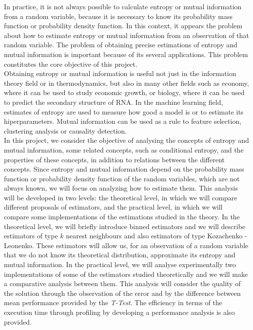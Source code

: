 In practice, it is not always possible to calculate entropy or mutual information from a random variable, because it is necessary to know its probability mass function or probability density function. In this context, it appears the problem about how to estimate entropy or mutual information from an observation of that random variable. The problem of obtaining precise estimations of entropy and mutual information is important because of its several applications. This problem constitutes the core objective of this project.\\

Obtaining entropy or mutual information is useful not just in the information theory field or in thermodynamics, but also in many other fields such as economy, where it can be used to study economic growth, or biology, where it can be used to predict the secondary structure of RNA. In the machine learning field, estimates of entropy are used to measure how good a model is or to estimate its hiperparameters. Mutual information can be used as a rule to feature selection, clustering analysis or causality detection.\\

In this project, we consider the objective of analysing the concepts of entropy and mutual information, some related concepts, such as conditional entropy, and the properties of these concepts, in addition to relations between the different concepts. Since entropy and mutual information depend on the probability mass function or probability density function of the random variables, which are not always known, we will focus on analyzing how to estimate them. This analysis will be developed in two levels: the theoretical level, in which we will compare different proposals of estimators, and the practical level, in which we will compare some implementations of the estimations studied in the theory. In the theoretical level, we will briefly introduce binned estimators and we will describe estimators of type $k$ nearest neighbours and also estimators of type Kozachenko - Leonenko. These estimators will allow us, for an observation of a random variable that we do not know its theoretical distribution, approximate its entropy and mutual information. In the practical level, we will analyse experimentally two implementations of some of the estimators studied theoretically and we will make a comparative analysis between them. This analysis will consider the quality of the solution through the observation of the error and by the difference between mean performance provided by the \textit{T-Test}. The efficiency in terms of the execution time through profiling by developing a performance analysis is also provided.\\

